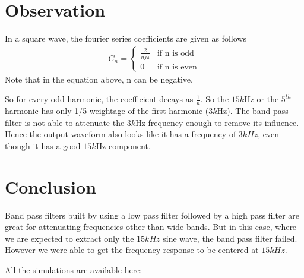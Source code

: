\documentclass{scrreprt}
\begin{document}
\section{Observation}
In a square wave, the fourier series coefficients are given as follows
\begin{align}
    C_n = \begin{cases}
             \frac{2}{nj\pi} & \text{if n is odd} \\
            0 & \text{if n is even}
            \end{cases}
\end{align}
Note that in the equation above, n can be negative. 

So for every odd harmonic, the coefficient decays as $\frac{1}{n}$. So the $15k$Hz or the $5^{th}$ harmonic has only 1/5 weightage of the first harmonic ($3k$Hz). The band pass filter is not able to attenuate the $3k$Hz frequency enough to remove its influence. Hence the output waveform also looks like it has a frequency of $3kHz$, even though it has a good $15k$Hz component.

\section{Conclusion}
Band pass filters built by using a low pass filter followed by a high pass filter are great for attenuating frequencies other than wide bands. But in this case, where we are expected to extract only the $15kHz$ sine wave, the band pass filter failed. However we were able to get the frequency response to be centered at $15kHz$.

All the simulations are available here: 

\end{document}
